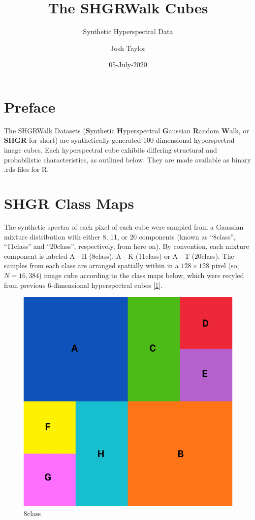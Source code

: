 \documentclass[]{article}
\title{The SHGRWalk Cubes}
\subtitle{Synthetic Hyperspectral Data}
\author{Josh Taylor}
\date{05-July-2020}
\begin{document}
\maketitle

{
\setcounter{tocdepth}{2}
\tableofcontents
}
\hypertarget{preface}{%
\section*{Preface}\label{preface}}

The SHGRWalk Datasets (\textbf{S}ynthetic \textbf{H}yperspectral \textbf{G}aussian \textbf{R}andom \textbf{W}alk, or \textbf{SHGR} for short) are synthetically generated 100-dimensional hyperspectral image cubes. Each hyperspectral cube exhibits differing structural and probabilistic characteristics, as outlined below. They are made available as binary .rds files for R.

\hypertarget{shgr-class-maps}{%
\section{SHGR Class Maps}\label{shgr-class-maps}}

The synthetic spectra of each pixel of each cube were sampled from a Gaussian mixture distribution with either 8, 11, or 20 components (known as ``8class'', ``11class'' and ``20class'', respectively, from here on). By convention, each mixture component is labeled A - H (8class), A - K (11class) or A - T (20class). The samples from each class are arranged spatially within in a \(128 \times 128\) pixel (so, \(N = 16,384\)) image cube according to the class maps below, which were recyled from previous 6-dimensional hyperspectral cubes {[}\protect\hyperlink{ref-MerenyiJainVillmann}{1}{]}.

\begin{figure}

{\centering \includegraphics[width=0.7\linewidth]{./figs/SGRW-8class-map-annotated} 

}

\caption{8class}\label{fig:unnamed-chunk-2}
\end{figure}
\end{document}
